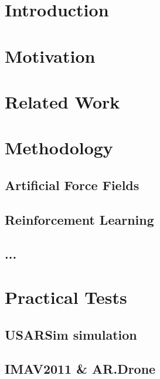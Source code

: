 \documentclass[11pt]{article}
\begin{document}
\pagestyle{empty} %
\tableofcontents
\pagebreak



\setcounter{page}{2}
\section{Introduction}



\section{Motivation}



\section{Related Work}



\section{Methodology}
\subsection{Artificial Force Fields}

\subsection{Reinforcement Learning}

\subsection{...}



\section{Practical Tests}
\subsection{USARSim simulation}

\subsection{IMAV2011 \& AR.Drone}
\end{document}
